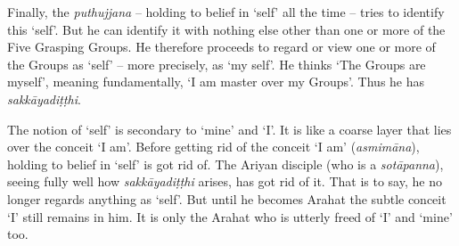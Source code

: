 Finally, the \emph{puthujjana} -- holding to belief in `self' all the time -- tries to identify this `self'. But he can identify it with nothing else other than one or more of the Five Grasping Groups. He therefore proceeds to regard or view one or more of the Groups as `self' -- more precisely, as `my self'. He thinks `The Groups are myself', meaning fundamentally, `I am master over my Groups'. Thus he has \emph{sakkāyadiṭṭhi}.

The notion of `self' is secondary to `mine' and `I'. It is like a coarse layer that lies over the conceit `I am'. Before getting rid of the conceit `I am' (\emph{asmimāna}), holding to belief in `self' is got rid of. The Ariyan disciple (who is a \emph{sotāpanna}), seeing fully well how \emph{sakkāyadiṭṭhi} arises, has got rid of it. That is to say, he no longer regards anything as `self'. But until he becomes Arahat the subtle conceit `I' still remains in him. It is only the Arahat who is utterly freed of `I' and `mine' too.
